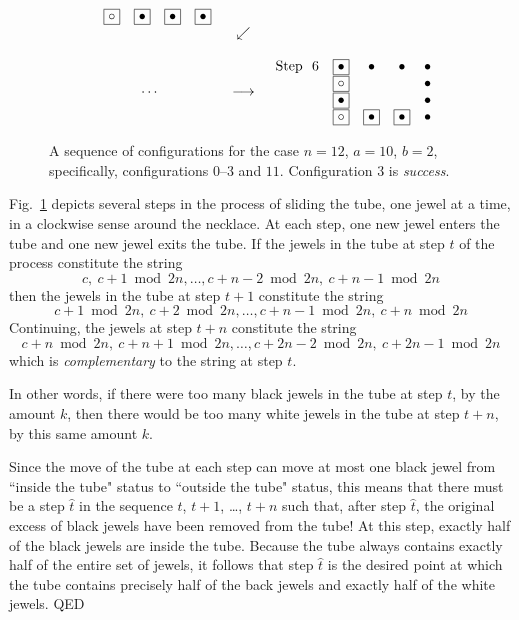 \documentclass{article}
\begin{document}
\begin{figure}[htb]
\[\begin{array}{ccc}
\begin{array}{rcccc}
& \fbox{$\circ$} &  \fbox{$\bullet$} & \fbox{$\bullet$} & \fbox{$\bullet$}
\end{array}
 \\  
 & \swarrow & \\  \\
\cdots & \longrightarrow &
\begin{array}{rcccc}
\mbox{Step } \ 6 &
 \fbox{$\bullet$} & \bullet & \bullet & \bullet  \\
& \fbox{$\circ$}   &                      &                      & \bullet  \\
&  \fbox{$\bullet$} &                      &                      & \bullet  \\
& \fbox{$\circ$}    &   \fbox{$\bullet$}          &    \fbox{$\bullet$}   & \bullet \\
\end{array}
\end{array}
\]
\caption{A sequence of configurations for the case $n=12$, $a = 10$, $b=2$, specifically, configurations $0$--$3$ and $11$.  Configuration $3$ is {\em success}.}
\label{fig:necklace}
\end{figure}

Fig.~\ref{fig:necklace} depicts several steps in the process of sliding the tube, one jewel at a time, in a clockwise sense around the necklace.  At each step, one new jewel enters the tube and one new jewel exits the tube.  If the jewels in the tube at step $t$ of the process constitute the string
\[ c, \ c+1 \bmod 2n, \ldots,  c+n-2 \bmod 2n, \ c+n-1 \bmod 2n \]
then the jewels in the tube at step $t+1$ constitute the string
\[ c+1 \bmod 2n,  \ c+2 \bmod 2n, \ldots,  c+n-1 \bmod 2n , \ c+n \bmod 2n \]
Continuing, the jewels at step $t + n$ constitute the string
\[ c+n \bmod 2n, \ c+n+1 \bmod 2n,   \ldots,  c+ 2n-2 \bmod 2n , \ c+2n-1 \bmod 2n \]
which is {\em complementary} to the string at step $t$.

\smallskip

In other words, if there were too many black jewels in the tube at step $t$, by the amount $k$, then there would be too many white jewels in the tube at step $t+n$, by this same amount $k$.

\smallskip

Since the move of the tube at each step can move at most one black jewel from ``inside the tube" status to ``outside the tube" status, this means that there must be a step $\hat{t}$ in the sequence $t$, $t+1$, \ldots, $t+n$ such that, after step $\hat{t}$, the original excess of black jewels have been removed from the tube!  At this step, exactly half of the black jewels are inside the tube.  Because the tube always contains exactly half of the entire set of jewels, it follows that step $\hat{t}$ is the desired point at which the tube contains precisely half of the back jewels and exactly half of the white jewels.  QED
\end{document}
